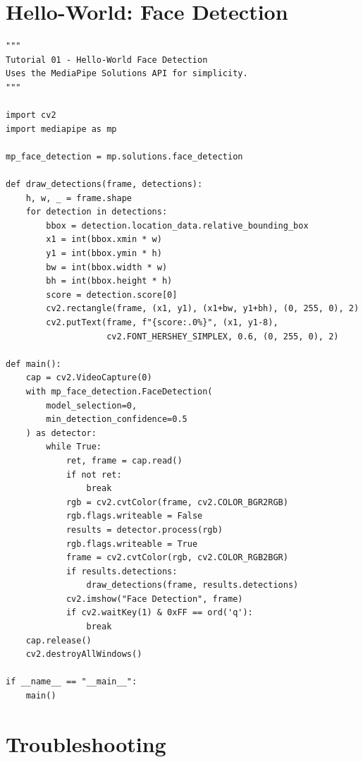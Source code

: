 \documentclass[12pt,a4paper]{article}
\begin{document}
\section{Hello-World: Face Detection}

\begin{lstlisting}[caption={Complete face-detection webcam demo}]
"""
Tutorial 01 - Hello-World Face Detection
Uses the MediaPipe Solutions API for simplicity.
"""

import cv2
import mediapipe as mp

mp_face_detection = mp.solutions.face_detection

def draw_detections(frame, detections):
    h, w, _ = frame.shape
    for detection in detections:
        bbox = detection.location_data.relative_bounding_box
        x1 = int(bbox.xmin * w)
        y1 = int(bbox.ymin * h)
        bw = int(bbox.width * w)
        bh = int(bbox.height * h)
        score = detection.score[0]
        cv2.rectangle(frame, (x1, y1), (x1+bw, y1+bh), (0, 255, 0), 2)
        cv2.putText(frame, f"{score:.0%}", (x1, y1-8),
                    cv2.FONT_HERSHEY_SIMPLEX, 0.6, (0, 255, 0), 2)

def main():
    cap = cv2.VideoCapture(0)
    with mp_face_detection.FaceDetection(
        model_selection=0,
        min_detection_confidence=0.5
    ) as detector:
        while True:
            ret, frame = cap.read()
            if not ret:
                break
            rgb = cv2.cvtColor(frame, cv2.COLOR_BGR2RGB)
            rgb.flags.writeable = False
            results = detector.process(rgb)
            rgb.flags.writeable = True
            frame = cv2.cvtColor(rgb, cv2.COLOR_RGB2BGR)
            if results.detections:
                draw_detections(frame, results.detections)
            cv2.imshow("Face Detection", frame)
            if cv2.waitKey(1) & 0xFF == ord('q'):
                break
    cap.release()
    cv2.destroyAllWindows()

if __name__ == "__main__":
    main()
\end{lstlisting}

\section{Troubleshooting}
\end{document}
